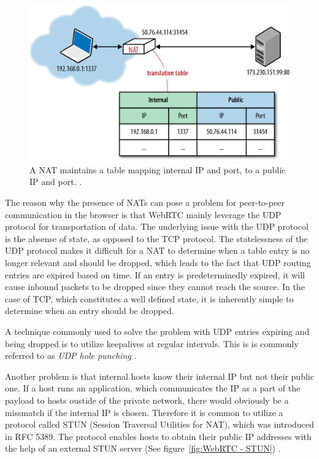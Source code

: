 \begin{figure}[htp]
\centering
\includegraphics[width=\textwidth,height=0.2\paperheight,keepaspectratio
]{figures/nat}
\caption{A NAT maintains a table mapping internal IP and port, to a public IP and port. \cite{NATIllustration:Online}.}
\label{fig:NAT}
\end{figure}

The reason why the presence of NATs can pose a problem for peer-to-peer communication in the browser is that WebRTC mainly leverage the UDP protocol for transportation of data. The underlying issue with the UDP protocol is the absense of state, as opposed to the TCP protocol. The statelessness of the UDP protocol makes it difficult for a NAT to determine when a table entry is no longer relevant and should be dropped, which leads to the fact that UDP routing entries are expired based on time. If an entry is predeterminedly expired, it will cause inbound packets to be dropped since they cannot reach the source. In the case of TCP, which constitutes a well defined state, it is inherently simple to determine when an entry should be dropped.

A technique commonly used to solve the problem with UDP entries expiring and being dropped is to utilize keepalives at regular intervals. This is is commonly referred to as \emph{UDP hole punching} \cite{UDPHolePunching:Online}.

Another problem is that internal hosts know their internal IP but not their public one. If a host runs an application, which communicates the IP as a part of the payload to hosts oustide of the private network, there would obviously be a missmatch if the internal IP is chosen. Therefore it is common to utilize a protocol called STUN (Session Traversal Utilities for NAT), which was introduced in RFC 5389. The protocol enables hosts to obtain their public IP addresses with the help of an external STUN server (See figure~\ref{fig:WebRTC - STUN}) \cite{RFC5389:Online}.

